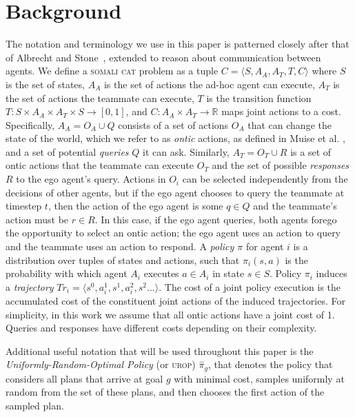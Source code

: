 \documentclass[letterpaper]{article}
\begin{document}
\section{Background}
The notation and terminology we use in this paper is patterned closely after that of Albrecht and Stone~, extended to reason about communication between agents. We define a \textsc{somali cat} problem as a tuple $C=\langle S, A_A, A_T, T, C \rangle$ where $S$ is the set of states, $A_A$ is the set of actions the ad-hoc agent can execute, $A_T$ is the set of actions the teammate can execute, $T$ is the transition function $T:S\times A_A \times A_T \times S \to [0,1]$, and $C: A_A \times A_T \rightarrow \mathbb{R}$ maps joint actions to a cost. Specifically, $A_A = O_A \cup Q$ consists of a set of actions $O_A$ that can change the state of the world, which we refer to as \emph{ontic} actions, as defined in Muise et al. , and a set of potential \emph{queries} $Q$ it can ask. Similarly, $A_T = O_T \cup R$ is a set of ontic actions that the teammate can execute $O_T$ and the set of possible \emph{responses} $R$ to the ego agent's query.
Actions in $O_i$ can be selected independently from the decisions of other agents, but if the ego agent chooses to query the teammate at timestep $t$, then the action of the ego agent is some $q \in Q$ and the teammate's action must be $r \in R$. In this case, if the ego agent queries, both agents forego the opportunity to select an ontic action; the ego agent uses an action to query and the teammate uses an action to respond.
A \emph{policy $\pi$} for agent $i$ is a distribution over tuples of states and actions, such that $\pi_{i}(s,a)$ is the probability with which agent $A_i$ executes $a \in A_i$ in state $s \in S$.
Policy $\pi_i$ induces a \emph{trajectory} $Tr_i=\langle s^0, a_i^1, s^1, a_i^2, s^2... \rangle$.
The cost of a joint policy execution is the accumulated cost of the constituent joint actions of the induced trajectories.
For simplicity, in this work we assume that all ontic actions have a joint cost of 1. Queries and responses have different costs depending on their complexity.

Additional useful notation that will be used throughout this paper is the \emph{Uniformly-Random-Optimal Policy} (or \textsc{urop}) $\hat{\pi}_{g}$, that denotes the policy that considers all plans that arrive at goal $g$ with minimal cost, samples uniformly at random from the set of these plans, and then chooses the first action of the sampled plan.
\end{document}
